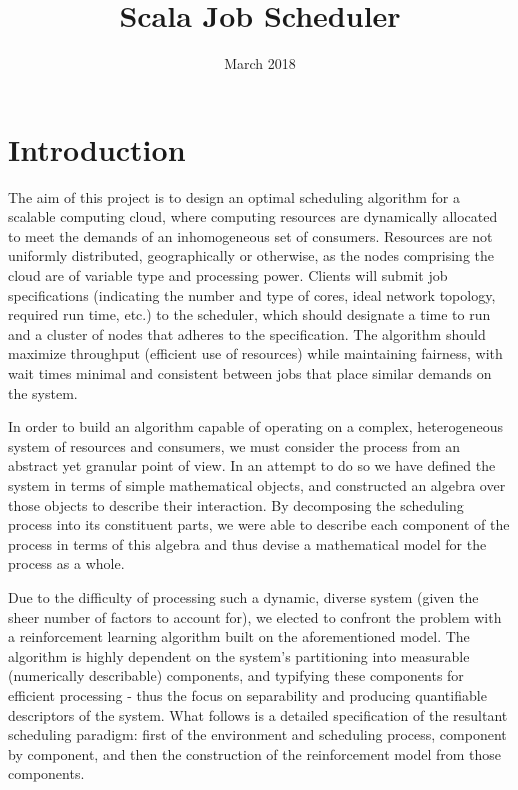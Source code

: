 \documentclass{article}
\title{Scala Job Scheduler}
\date{March 2018}
\theoremstyle{definition}
\theoremstyle{remark}
\begin{document}
	
	\maketitle
	
	\newpage
	\tableofcontents
	
	\newpage
	
	
	\section*{Introduction}

	\indent
	
	The aim of this project is to design an optimal scheduling algorithm for a scalable computing cloud, where
 	computing resources are dynamically allocated to meet the demands of an inhomogeneous set of consumers. Resources
 	are not uniformly distributed, geographically or otherwise, as the nodes comprising the cloud are of variable type
 	and processing power. Clients will submit job specifications (indicating the number and type of cores, ideal
	network topology, required run time, etc.) to the scheduler, which should designate a time to run and a cluster of
	nodes that adheres to the specification. The algorithm should maximize throughput (efficient use of resources)
	while maintaining fairness, with wait times minimal and consistent between jobs that place similar demands on the
	system.
	
	In order to build an algorithm capable of operating on a complex, heterogeneous system of resources and consumers,
	we must consider the process from an abstract yet granular point of view. In an attempt to do so we have defined
	the system in terms of simple mathematical objects, and constructed an algebra over those objects to describe
	their interaction. By decomposing the scheduling process into its constituent parts, we were able to describe
	each component of the process in terms of this algebra and thus devise a mathematical model for the process as a
	whole. 
	
	Due to the difficulty of processing such a dynamic, diverse system (given the sheer number of factors to account
	for), we elected to confront the problem with a reinforcement learning algorithm built on the aforementioned model.
	The algorithm is highly dependent on the system's partitioning into measurable (numerically describable)
	components, and typifying these components for efficient processing - thus the focus on separability and producing
	quantifiable descriptors of the system. What follows is a detailed specification of the resultant scheduling
	paradigm: first of the environment and scheduling process, component by component, and then the construction of
	the reinforcement model from those components.
	
\end{document}
